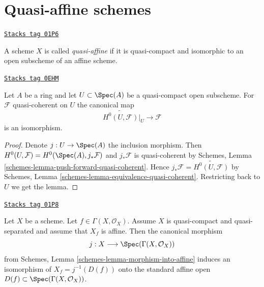 \section{Quasi-affine schemes}
\label{properties-section-quasi-affine}
\begin{definition}
\label{properties-definition-quasi-affine}
\href{https://stacks.math.columbia.edu/tag/01P6}{\texttt{Stacks tag 01P6}}

A scheme $X$ is called {\it quasi-affine} if it is quasi-compact
and isomorphic to an open subscheme of an affine scheme.
\end{definition}

\begin{lemma}
\label{properties-lemma-quasi-coherent-quasi-affine}
\href{https://stacks.math.columbia.edu/tag/0EHM}{\texttt{Stacks tag 0EHM}}

Let $A$ be a ring and let $U \subset \Spec(A)$ be a quasi-compact
open subscheme. For $\mathcal{F}$ quasi-coherent on $U$ the canonical map
$$
\widetilde{H^0(U, \mathcal{F})}|_U \to \mathcal{F}
$$
is an isomorphism.
\end{lemma}

\begin{proof}
Denote $j : U \to \Spec(A)$ the inclusion morphism. Then
$H^0(U, \mathcal{F}) = H^0(\Spec(A), j_*\mathcal{F})$ and
$j_*\mathcal{F}$ is quasi-coherent by
Schemes, Lemma \ref{schemes-lemma-push-forward-quasi-coherent}.
Hence $j_*\mathcal{F} = \widetilde{H^0(U, \mathcal{F})}$ by
Schemes, Lemma \ref{schemes-lemma-equivalence-quasi-coherent}.
Restricting back to $U$ we get the lemma.
\end{proof}

\begin{lemma}
\label{properties-lemma-invert-f-affine}
\href{https://stacks.math.columbia.edu/tag/01P8}{\texttt{Stacks tag 01P8}}

Let $X$ be a scheme. Let $f \in \Gamma(X, \mathcal{O}_X)$.
Assume $X$ is quasi-compact and quasi-separated and assume that
$X_f$ is affine. Then the canonical morphism
$$
j : X \longrightarrow \Spec(\Gamma(X, \mathcal{O}_X))
$$
from Schemes, Lemma \ref{schemes-lemma-morphism-into-affine}
induces an isomorphism of $X_f = j^{-1}(D(f))$ onto the standard affine
open $D(f) \subset \Spec(\Gamma(X, \mathcal{O}_X))$.
\end{lemma}

